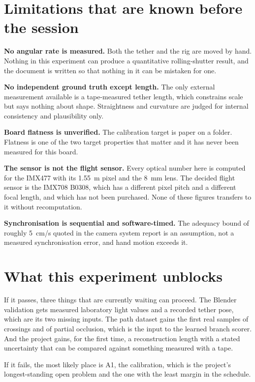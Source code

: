 \section*{Limitations that are known before the session}

\textbf{No angular rate is measured.} Both the tether and the rig are moved
by hand. Nothing in this experiment can produce a quantitative
rolling-shutter result, and the document is written so that nothing in it
can be mistaken for one.

\textbf{No independent ground truth except length.} The only external
measurement available is a tape-measured tether length, which constrains
scale but says nothing about shape. Straightness and curvature are judged for
internal consistency and plausibility only.

\textbf{Board flatness is unverified.} The calibration target is paper on a
folder. Flatness is one of the two target properties that matter and it has
never been measured for this board.

\textbf{The sensor is not the flight sensor.} Every optical number here is
computed for the IMX477 with its 1.55~\textmu m pixel and the 8~mm lens. The
decided flight sensor is the IMX708 B0308, which has a different pixel pitch
and a different focal length, and which has not been purchased. None of these
figures transfers to it without recomputation.

\textbf{Synchronisation is sequential and software-timed.} The adequacy bound
of roughly 5~cm/s quoted in the camera system report is an assumption, not a
measured synchronisation error, and hand motion exceeds it.

\section*{What this experiment unblocks}

If it passes, three things that are currently waiting can proceed. The
Blender validation gets measured laboratory light values and a recorded
tether pose, which are its two missing inputs. The path dataset gains the
first real samples of crossings and of partial occlusion, which is the input
to the learned branch scorer. And the project gains, for the first time, a
reconstruction length with a stated uncertainty that can be compared against
something measured with a tape.

If it fails, the most likely place is A1, the calibration, which is the
project's longest-standing open problem and the one with the least margin in
the schedule.

